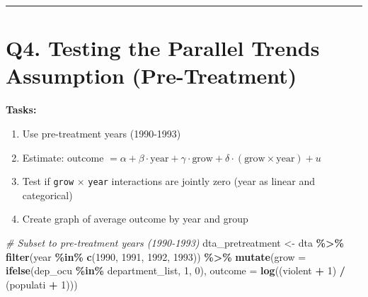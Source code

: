 \documentclass[
]{article}
\newenvironment{Shaded}{\begin{snugshade}}{\end{snugshade}}
\newcommand{\AttributeTok}[1]{\textcolor[rgb]{0.13,0.29,0.53}{#1}}
\newcommand{\CommentTok}[1]{\textcolor[rgb]{0.56,0.35,0.01}{\textit{#1}}}
\newcommand{\DecValTok}[1]{\textcolor[rgb]{0.00,0.00,0.81}{#1}}
\newcommand{\FunctionTok}[1]{\textcolor[rgb]{0.13,0.29,0.53}{\textbf{#1}}}
\newcommand{\NormalTok}[1]{#1}
\newcommand{\OtherTok}[1]{\textcolor[rgb]{0.56,0.35,0.01}{#1}}
\newcommand{\SpecialCharTok}[1]{\textcolor[rgb]{0.81,0.36,0.00}{\textbf{#1}}}
\providecommand{\tightlist}{%
  \setlength{\itemsep}{0pt}\setlength{\parskip}{0pt}}
\begin{document}
\begin{center}\rule{0.5\linewidth}{0.5pt}\end{center}

\section{Q4. Testing the Parallel Trends Assumption
(Pre-Treatment)}\label{q4.-testing-the-parallel-trends-assumption-pre-treatment}

\textbf{Tasks:}

\begin{enumerate}
\def\labelenumi{\arabic{enumi}.}
\tightlist
\item
  Use pre-treatment years (1990-1993)
\item
  Estimate: outcome
  \(= \alpha + \beta \cdot \text{year} + \gamma \cdot \text{grow} + \delta \cdot (\text{grow} \times \text{year}) + u\)
\item
  Test if \texttt{grow} \(\times\) \texttt{year} interactions are
  jointly zero (year as linear and categorical)
\item
  Create graph of average outcome by year and group
\end{enumerate}

\begin{Shaded}
\begin{Highlighting}[]
\CommentTok{\# Subset to pre{-}treatment years (1990{-}1993)}
\NormalTok{dta\_pretreatment }\OtherTok{\textless{}{-}}\NormalTok{ dta }\SpecialCharTok{\%\textgreater{}\%}
  \FunctionTok{filter}\NormalTok{(year }\SpecialCharTok{\%in\%} \FunctionTok{c}\NormalTok{(}\DecValTok{1990}\NormalTok{, }\DecValTok{1991}\NormalTok{, }\DecValTok{1992}\NormalTok{, }\DecValTok{1993}\NormalTok{)) }\SpecialCharTok{\%\textgreater{}\%}
  \FunctionTok{mutate}\NormalTok{(}\AttributeTok{grow =} \FunctionTok{ifelse}\NormalTok{(dep\_ocu }\SpecialCharTok{\%in\%}\NormalTok{ department\_list, }\DecValTok{1}\NormalTok{, }\DecValTok{0}\NormalTok{),}
         \AttributeTok{outcome =} \FunctionTok{log}\NormalTok{((violent }\SpecialCharTok{+} \DecValTok{1}\NormalTok{) }\SpecialCharTok{/}\NormalTok{ (populati }\SpecialCharTok{+} \DecValTok{1}\NormalTok{)))}
\end{Highlighting}
\end{Shaded}
\end{document}
